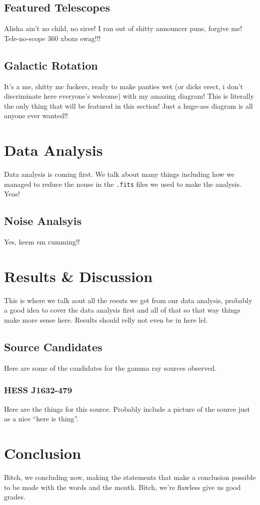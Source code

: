 \documentclass[a4paper, titlepage, oneside]{article}
\begin{document}
\begin{multicols}{2}
\subsection{Featured Telescopes}
Alisha ain't no child, no siree! I ran out of shitty announcer puns, forgive me! Tele-no-scope 360 xboxs swag!!!

\subsection{Galactic Rotation}
It's a me, shitty mc fuckers, ready to make panties wet (or dicks erect, i don't discriminate here everyone's welcome) with my amazing diagram! This is literally the only thing that will be featured in this section! Just a huge-ass diagram is all anyone ever wanted!!

\section{Data Analysis}
Data analysis is coming first. We talk about many things including how we managed to reduce the nouse in the \texttt{.fits} files we used to make the analysis. Yeas!

\subsection{Noise Analsyis}
Yes, keem em cumming!!

\section{Results \& Discussion}
This is where we talk aout all the resuts we get from our data analysis, probably a good idea to cover the data analysis first and all of that so that way things make more sense here. Results should relly not even be in here lel.

\subsection{Source Candidates}
Here are some of the candidates for the gamma ray sources observed.

\subsubsection{HESS J1632-479}
Here are the things for this source. Probably include a picture of the source just as a nice ``here is thing''.

\section{Conclusion}
Bitch, we concluding now, making the statements that make a conclusion possible to be made with the words and the mouth. Bitch, we're flawless give us good grades.
\end{multicols}

\printbibliography[heading=bibintoc]
\end{document}
